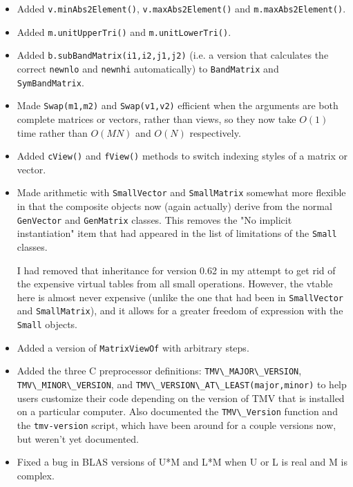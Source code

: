 \documentclass[twoside,letterpaper,11pt]{article}
\renewcommand{\tt}[1]{{\lstinline {#1}}}
\begin{document}
\begin{description}
\begin{itemize}
\item Added \tt{v.minAbs2Element()}, \tt{v.maxAbs2Element()} and \tt{m.maxAbs2Element()}.

\item Added \tt{m.unitUpperTri()} and \tt{m.unitLowerTri()}.

\item Added \tt{b.subBandMatrix(i1,i2,j1,j2)} (i.e. a version that calculates the correct 
\tt{newnlo} and \tt{newnhi} automatically) to \tt{BandMatrix} and \tt{SymBandMatrix}.

\item Made \tt{Swap(m1,m2)} and \tt{Swap(v1,v2)} efficient when the arguments are both
complete matrices or vectors, rather than views, so they now take $O(1)$ time rather than
$O(MN)$ and $O(N)$ respectively.

\item Added \tt{cView()} and \tt{fView()} methods to switch indexing styles of a matrix or vector.

\item Made arithmetic with \tt{SmallVector} and \tt{SmallMatrix} somewhat more flexible in that
the composite objects now (again actually) derive from the normal \tt{GenVector} and
\tt{GenMatrix} classes.  This removes the "No implicit instantiation" item that had appeared
in the list of limitations of the \tt{Small} classes.

I had removed that inheritance for version 0.62 in my attempt to get rid of the expensive virtual
tables from all small operations.  However, the vtable here is almost never expensive 
(unlike the one that had been in \tt{SmallVector} and \tt{SmallMatrix}), and
it allows for a greater freedom of expression with the \tt{Small} objects.

\item Added a version of \tt{MatrixViewOf} with arbitrary steps.

\item Added the three C preprocessor definitions: \tt{TMV\_MAJOR\_VERSION}, 
\tt{TMV\_MINOR\_VERSION},
and \tt{TMV\_VERSION\_AT\_LEAST(major,minor)} to help users customize
their code depending on the version of TMV that is installed on a particular
computer.  Also documented the \tt{TMV\_Version} function and the \tt{tmv-version}
script, which have been around
for a couple versions now, but weren't yet documented.

\item Fixed a bug in BLAS versions of U*M and L*M when U or L is real and
M is complex.


\end{itemize}
\end{description}
\end{document}
